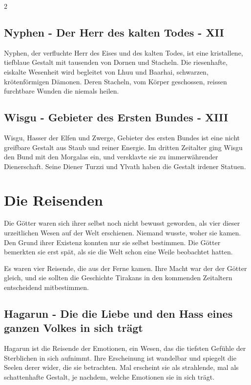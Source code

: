 \begin{multicols*}{2}
\subsection{Nyphen - Der Herr des kalten Todes - XII}\label{subsec:nyphen-der-herr-des-kalten-todes}

Nyphen, der verfluchte Herr des Eises und des kalten Todes, ist eine kristallene, tiefblaue Gestalt mit tausenden von Dornen und Stacheln.
Die riesenhafte, eiskalte Wesenheit wird begleitet von Lhuu und Baarhai, schwarzen, krötenförmigen Dämonen.
Deren Stacheln, vom Körper geschossen, reissen furchtbare Wunden die niemals heilen.

\subsection{Wisgu - Gebieter des Ersten Bundes - XIII}\label{subsec:wisgu-gebieter-des-ersten-bundes}

Wisgu, Hasser der Elfen und Zwerge, Gebieter des ersten Bundes ist eine nicht greifbare Gestalt aus Staub und reiner Energie.
Im dritten Zeitalter ging Wisgu den Bund mit den Morgalas ein, und versklavte sie zu immerwährender Dienerschaft.
Seine Diener Turzzi und Ylvath haben die Gestalt irdener Statuen.


\section{Die Reisenden}\label{sec:die-reisenden}

Die Götter waren sich ihrer selbst noch nicht bewusst geworden, als vier dieser urzeitlichen Wesen auf der Welt erschienen.
Niemand wusste, woher sie kamen.
Den Grund ihrer Existenz konnten nur sie selbst bestimmen.
Die Götter bemerkten sie erst spät, als sie die Welt schon eine Weile beobachtet hatten.

Es waren vier Reisende, die aus der Ferne kamen.
Ihre Macht war der der Götter gleich, und sie sollten die Geschichte Tirakans in den kommenden Zeitaltern entscheidend mitbestimmen.

\subsection{Hagarun - Die die Liebe und den Hass eines ganzen Volkes in sich trägt}\label{subsec:hagarun-die-die-liebe-und-den-hass-eines-ganzen-volkes-in-sich-tragt}

Hagarun ist die Reisende der Emotionen, ein Wesen, das die tiefsten Gefühle der Sterblichen in sich aufnimmt.
Ihre Erscheinung ist wandelbar und spiegelt die Seelen derer wider, die sie betrachten.
Mal erscheint sie als strahlende, mal als schattenhafte Gestalt, je nachdem, welche Emotionen sie in sich trägt.


\end{multicols*}

